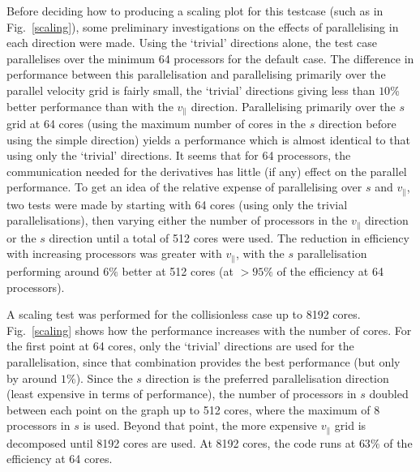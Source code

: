 Before deciding how to producing a scaling plot for this testcase (such as in Fig.~\ref{scaling}), some preliminary investigations on
the effects of parallelising in each direction were made. Using the `trivial' directions alone, the test case parallelises over the minimum
64 processors for the default case. The difference in performance
between this parallelisation and parallelising primarily over the parallel velocity grid is fairly small, the `trivial' directions giving
less than $10$\% better performance than with the $v_\parallel$ direction. Parallelising primarily over the $s$ grid at
64 cores (using the maximum number of cores in the $s$ direction before using the simple direction) yields a performance which is almost identical
to that using only the `trivial' directions. It seems that for 64 processors, the communication needed for the derivatives has little (if any) effect
on the parallel performance. To get an idea of the relative expense of parallelising over $s$ and $v_\parallel$, two tests were made by starting with 64
cores (using only the trivial parallelisations), then varying either the number of processors in the $v_\parallel$ direction
or the $s$ direction until a total of 512 cores were used. The reduction in efficiency with increasing processors was greater with $v_\parallel$, with the $s$
parallelisation performing around $6\%$ better at 512 cores (at $>95\%$ of the efficiency at 64 processors).

A scaling test was performed for the collisionless case up to 8192 cores. Fig.~\ref{scaling} shows how the performance increases with the number of cores.
For the first point at 64 cores, only the `trivial' directions are used for the parallelisation, since that combination provides the best performance 
(but only by around $1\%$). Since the $s$ direction is the preferred parallelisation direction (least expensive in terms of performance), the number of 
processors in $s$ doubled between each point on the graph up to 512 cores, where the maximum of 8 processors in $s$ is used. Beyond that point, the more expensive $v_\parallel$ grid is decomposed until
8192 cores are used. At 8192 cores, the code runs at $63\%$ of the efficiency at 64 cores.

